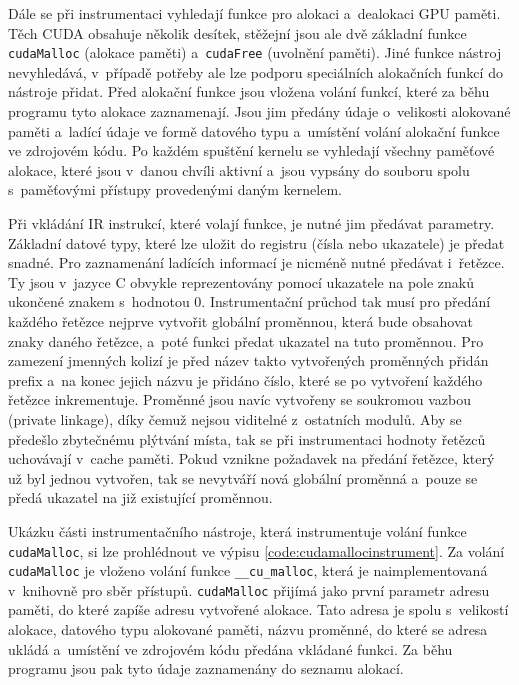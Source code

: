 Dále se při instrumentaci vyhledají funkce pro alokaci a~dealokaci GPU paměti. Těch CUDA obsahuje několik desítek, stěžejní jsou ale dvě základní funkce \texttt{cudaMalloc} (alokace paměti) a~\texttt{cudaFree} (uvolnění paměti). Jiné funkce nástroj nevyhledává, v~případě potřeby ale lze podporu speciálních alokačních funkcí do nástroje přidat. Před alokační funkce jsou vložena volání funkcí, které za běhu programu tyto alokace zaznamenají. Jsou jim předány údaje o~velikosti alokované paměti a~ladící údaje ve formě datového typu a~umístění volání alokační funkce ve zdrojovém kódu. Po každém spuštění kernelu se vyhledají všechny paměťové alokace, které jsou v~danou chvíli aktivní a~jsou vypsány do souboru spolu s~paměťovými přístupy provedenými daným kernelem.

Při vkládání IR instrukcí, které volají funkce, je nutné jim předávat parametry. Základní datové typy, které lze uložit do registru (čísla nebo ukazatele) je předat snadné. Pro zaznamenání ladících informací je nicméně nutné předávat i~řetězce. Ty jsou v~jazyce C obvykle reprezentovány pomocí ukazatele na pole znaků ukončené znakem s~hodnotou 0. Instrumentační průchod tak musí pro předání každého řetězce nejprve vytvořit globální proměnnou, která bude obsahovat znaky daného řetězce, a~poté funkci předat ukazatel na tuto proměnnou. Pro zamezení jmenných kolizí je před název takto vytvořených proměnných přidán prefix a~na konec jejich názvu je přidáno číslo, které se po vytvoření každého řetězce inkrementuje. Proměnné jsou navíc vytvořeny se soukromou vazbou (private linkage), díky čemuž nejsou viditelné z~ostatních modulů. Aby se předešlo zbytečnému plýtvání místa, tak se při instrumentaci hodnoty řetězců uchovávají v~cache paměti. Pokud vznikne požadavek na předání řetězce, který už byl jednou vytvořen, tak se nevytváří nová globální proměnná a~pouze se předá ukazatel na již existující proměnnou.

Ukázku části instrumentačního nástroje, která instrumentuje volání funkce \texttt{cudaMalloc}, si lze prohlédnout ve výpisu \ref{code:cudamallocinstrument}. Za volání \texttt{cudaMalloc} je vloženo volání funkce \texttt{\_\_cu\_malloc}, která je naimplementovaná v~knihovně pro sběr přístupů. \texttt{cudaMalloc} přijímá jako první parametr adresu paměti, do které zapíše adresu vytvořené alokace. Tato adresa je spolu s~velikostí alokace, datového typu alokované paměti, názvu proměnné, do které se adresa ukládá a~umístění ve zdrojovém kódu předána vkládané funkci. Za běhu programu jsou pak tyto údaje zaznamenány do seznamu alokací.

